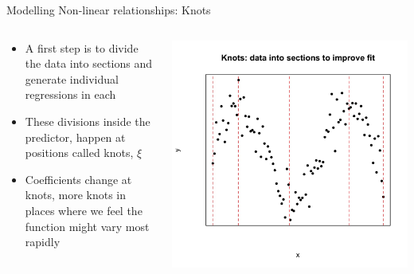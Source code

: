 \documentclass[english]{beamer}
\newcommand{\alertblue}[1]{{\color{blue}#1}}
\begin{document}
\begin{frame}{Modelling Non-linear relationships: Knots}
    \begin{columns}
        \begin{column}{0.65\textwidth}
            \begin{itemize}
                \item A first step is to divide the data into sections and generate individual regressions in each  
                \item These divisions inside the predictor, happen at positions called \alertblue{knots, \(\xi\)} 
                \item \alertblue{Coefficients} change at knots, more knots in places where we feel the \alertblue{function might vary most rapidly}
            \end{itemize}
        \end{column}
        \begin{column}{0.49\textwidth}
            \centering
            \includegraphics[width=\linewidth]{images/knots.jpeg} 
        \end{column}
    \end{columns}
\end{frame}
\end{document}
